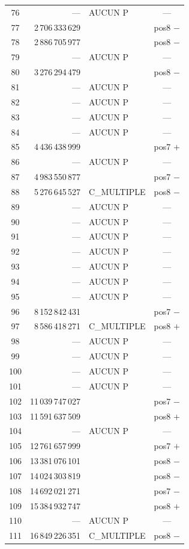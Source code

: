 \documentclass[11pt,a4paper]{article}
\begin{document}
{\begin{longtable}{@{}c r l c@{}}
76 & --- & AUCUN P & --- \\
77 & 2\,706\,333\,629 & & pos8 $-$ \\
78 & 2\,886\,705\,977 & & pos8 $-$ \\
79 & --- & AUCUN P & --- \\
80 & 3\,276\,294\,479 & & pos8 $-$ \\
81 & --- & AUCUN P & --- \\
82 & --- & AUCUN P & --- \\
83 & --- & AUCUN P & --- \\
84 & --- & AUCUN P & --- \\
85 & 4\,436\,438\,999 & & pos7 $+$ \\
86 & --- & AUCUN P & --- \\
87 & 4\,983\,550\,877 & & pos7 $-$ \\
88 & 5\,276\,645\,527 & C\_MULTIPLE & pos8 $-$ \\
89 & --- & AUCUN P & --- \\
90 & --- & AUCUN P & --- \\
91 & --- & AUCUN P & --- \\
92 & --- & AUCUN P & --- \\
93 & --- & AUCUN P & --- \\
94 & --- & AUCUN P & --- \\
95 & --- & AUCUN P & --- \\
96 & 8\,152\,842\,431 & & pos7 $-$ \\
97 & 8\,586\,418\,271 & C\_MULTIPLE & pos8 $+$ \\
98 & --- & AUCUN P & --- \\
99 & --- & AUCUN P & --- \\
100 & --- & AUCUN P & --- \\
101 & --- & AUCUN P & --- \\
102 & 11\,039\,747\,027 & & pos7 $-$ \\
103 & 11\,591\,637\,509 & & pos8 $+$ \\
104 & --- & AUCUN P & --- \\
105 & 12\,761\,657\,999 & & pos7 $+$ \\
106 & 13\,381\,076\,101 & & pos8 $-$ \\
107 & 14\,024\,303\,819 & & pos8 $-$ \\
108 & 14\,692\,021\,271 & & pos7 $-$ \\
109 & 15\,384\,932\,747 & & pos8 $+$ \\
110 & --- & AUCUN P & --- \\
111 & 16\,849\,226\,351 & C\_MULTIPLE & pos8 $-$ \\
\bottomrule
\end{longtable}}
\end{document}
